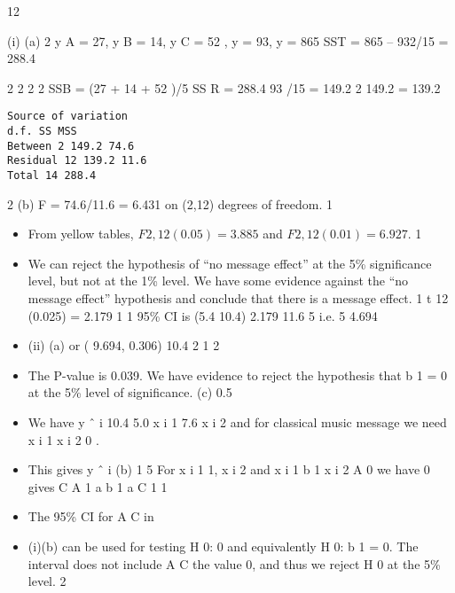 \documentclass[a4paper,12pt]{article}
\begin{document}
\newpage
12
\item (i)
(a)
2
y A = 27, y B = 14, y C = 52 , y = 93, y = 865
SST = 865 – 932/15 = 288.4

2
2
2
2
SSB = (27 + 14 + 52 )/5
SS R = 288.4
93 /15 = 149.2
2
149.2 = 139.2
\begin{verbatim}
Source of variation
d.f. SS MSS
Between 2 149.2 74.6
Residual 12 139.2 11.6
Total 14 288.4
\end{verbatim}
2
(b)
F = 74.6/11.6 = 6.431 on (2,12) degrees of freedom. 1
\begin{itemize}
\item From yellow tables, $F 2,12 (0.05) = 3.885$ and $F 2,12 (0.01) = 6.927$. 1
\item We can reject the hypothesis of “no message effect” at the 5\% significance level, but not at the 1\% level. We have some evidence
against the “no message effect” hypothesis and conclude that there is a message effect. 1
t 12 (0.025) = 2.179 1
1
95\% CI is (5.4 10.4) 2.179 11.6
5
i.e. 5 4.694
\item (ii)
(a)
or ( 9.694, 0.306)
10.4
2
1
2
\item The P-value is 0.039. We have evidence to reject the hypothesis that
b 1 = 0 at the 5\% level of significance.
(c)
0.5
\item We have y ˆ i 10.4 5.0 x i 1 7.6 x i 2 and for classical music
message we need x i 1 x i 2 0 .
\item This gives y ˆ i
(b)
1
5
For x i 1 1, x i 2
and x i 1
b 1
x i 2
A
0 we have
0 gives
C
A
1
a b 1
a
C
1
1
\item The 95\% CI for A C in \item (i)(b) can be used for testing H 0:
0 and equivalently H 0: b 1 = 0. The interval does not include
A
C
the value 0, and thus we reject H 0 at the 5\% level.
2
\end{itemize}
\end{document}
